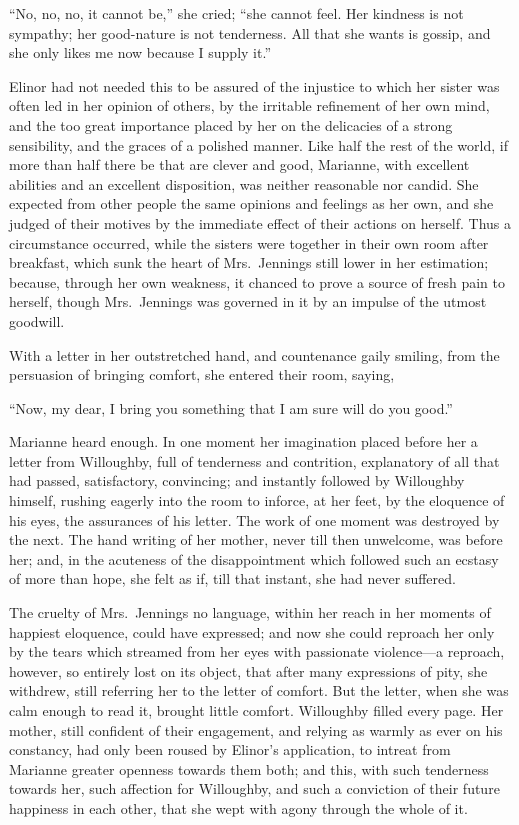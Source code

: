 ``No, no, no, it cannot be,'' she cried;
``she cannot feel.  Her kindness is not sympathy;
her good-nature is not tenderness.  All that she wants
is gossip, and she only likes me now because I supply it.''

Elinor had not needed this to be assured of the injustice
to which her sister was often led in her opinion of others,
by the irritable refinement of her own mind, and the too
great importance placed by her on the delicacies of a
strong sensibility, and the graces of a polished manner.
Like half the rest of the world, if more than half there
be that are clever and good, Marianne, with excellent
abilities and an excellent disposition, was neither
reasonable nor candid.  She expected from other people
the same opinions and feelings as her own, and she judged
of their motives by the immediate effect of their actions
on herself.  Thus a circumstance occurred, while the
sisters were together in their own room after breakfast,
which sunk the heart of Mrs.\ Jennings still lower
in her estimation; because, through her own weakness,
it chanced to prove a source of fresh pain to herself,
though Mrs.\ Jennings was governed in it by an impulse
of the utmost goodwill.

With a letter in her outstretched hand, and countenance
gaily smiling, from the persuasion of bringing comfort,
she entered their room, saying,

``Now, my dear, I bring you something that I am sure
will do you good.''

Marianne heard enough.  In one moment her imagination
placed before her a letter from Willoughby, full of tenderness
and contrition, explanatory of all that had passed, satisfactory,
convincing; and instantly followed by Willoughby himself,
rushing eagerly into the room to inforce, at her feet,
by the eloquence of his eyes, the assurances of his letter.
The work of one moment was destroyed by the next.
The hand writing of her mother, never till then unwelcome,
was before her; and, in the acuteness of the disappointment
which followed such an ecstasy of more than hope,
she felt as if, till that instant, she had never suffered.

The cruelty of Mrs.\ Jennings no language, within
her reach in her moments of happiest eloquence,
could have expressed; and now she could reproach her
only by the tears which streamed from her eyes with
passionate violence---a reproach, however, so entirely
lost on its object, that after many expressions of pity,
she withdrew, still referring her to the letter of comfort.
But the letter, when she was calm enough to read it,
brought little comfort.  Willoughby filled every page.
Her mother, still confident of their engagement, and relying
as warmly as ever on his constancy, had only been roused
by Elinor's application, to intreat from Marianne greater
openness towards them both; and this, with such tenderness
towards her, such affection for Willoughby, and such
a conviction of their future happiness in each other,
that she wept with agony through the whole of it.


